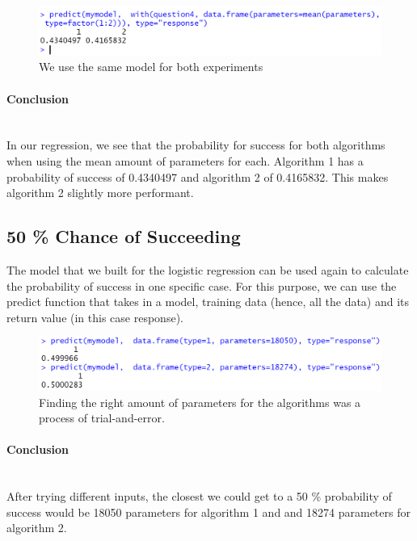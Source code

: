 \documentclass[14]{article}
\begin{document}
\begin{figure}[!htb]
	\includegraphics[width=1.0\textwidth]{img/question4/question4_groups.PNG}
	\captionsetup{width=1.0\textwidth}
	\centering 
	\caption{We use the same model for both experiments}
\end{figure}\mbox{}

\newpage
\paragraph{Conclusion}\mbox{}\\
In our regression, we see that the probability for success for both algorithms when using the mean amount of parameters for each. Algorithm 1 has a probability of success of 0.4340497 and algorithm 2 of 0.4165832. This makes algorithm 2 slightly more performant.

\subsection{50 \% Chance of Succeeding}
The model that we built for the logistic regression can be used again to calculate the probability of success in one specific case. For this purpose, we can use the predict function that takes in a model, training data (hence, all the data) and its return value (in this case response).

\begin{figure}[!htb]
	\includegraphics[width=1.0\textwidth]{img/question4/R_50_Percent_Chance.PNG}
	\captionsetup{width=1.0\textwidth}
	\centering 
	\caption{Finding the right amount of parameters for the algorithms was a process of trial-and-error. }
\end{figure}
	
\paragraph{Conclusion}\mbox{}\\
After trying different inputs, the closest we could get to a 50 \% probability of success would be 18050 parameters for algorithm 1 and and 18274 parameters for algorithm 2.
\end{document}
